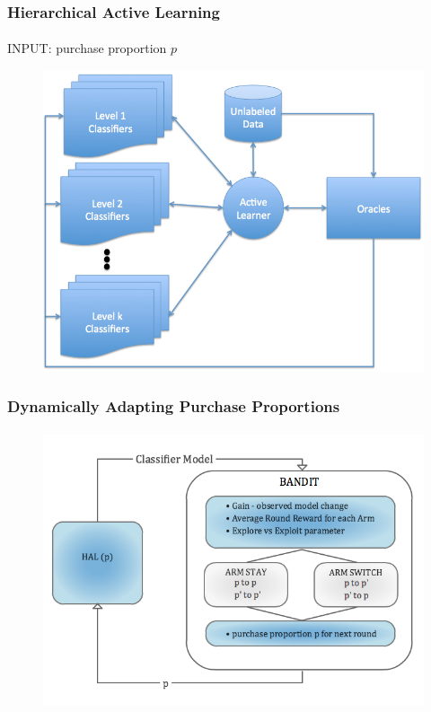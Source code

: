 \documentclass{beamer}
\begin{document}
\begin{frame}
    \frametitle{Hierarchical Active Learning}  %
    \framesubtitle{}
    \par INPUT: purchase proportion $p$
    \begin{figure}[!htb]
        \centering
        \includegraphics[width=0.65\columnwidth]{fig/AL2}
        \label{fig:HALapproach}
    \end{figure}
\end{frame}
\begin{frame}
    \frametitle{Dynamically Adapting Purchase Proportions}  %
    \framesubtitle{}
    \begin{figure}[!htb]
        \centering
        \includegraphics[width=1.0\columnwidth]{fig/BANDIT}
        \label{fig:BANDIT}
    \end{figure}
\end{frame}
\end{document}
